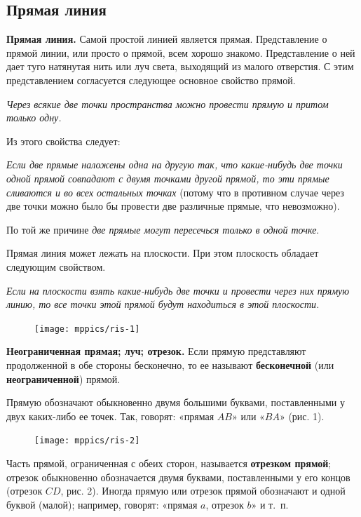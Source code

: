 \documentclass[oneside]{book}
\begin{document}
\subsection*{Прямая линия}

\textbf{Прямая линия.}
Самой простой линией является прямая.
Представление о прямой линии, или просто о прямой, всем хорошо знакомо.
Представление о ней дает туго натянутая нить или луч света, выходящий из малого отверстия.
С этим представлением согласуется следующее основное свойство прямой.

\textit{Через всякие две точки пространства можно провести прямую и притом только одну.}

Из этого свойства следует:

\textit{Если две прямые наложены одна на другую так, что какие-нибудь две точки одной прямой совпадают с двумя точками другой прямой, то эти прямые сливаются и во всех остальных точках} (потому что в противном случае через две точки можно было бы провести две различные прямые, что невозможно).

По той же причине \textit{две прямые могут пересечься только в одной точке}.

Прямая линия может лежать на плоскости.
При этом плоскость обладает следующим свойством.

\textit{Если на плоскости взять какие-нибудь две точки и провести через них прямую линию, то все точки этой прямой будут находиться в этой плоскости.}

\begin{figure}
\texttt{[image: mppics/ris-1]}
\caption{}
\end{figure}

\textbf{Неограниченная прямая; луч; отрезок.}
Если прямую представляют продолженной в обе стороны бесконечно, то ее называют \textbf{бесконечной} (или \textbf{неограниченной}) прямой.

Прямую обозначают обыкновенно двумя большими буквами, поставленными у двух каких-либо ее точек.
Так, говорят:
«прямая $AB$» или «$BA$» (рис. 1).

\begin{figure}
\texttt{[image: mppics/ris-2]}
\caption{}
\end{figure}

Часть прямой, ограниченная с обеих сторон, называется \textbf{отрезком прямой};
отрезок обыкновенно обозначается двумя буквами, поставленными у его концов (отрезок $CD$, рис. 2).
Иногда прямую или отрезок прямой 
обозначают и одной буквой
(малой);
например, говорят:
«прямая $a$, отрезок $b$» и т.~п.
\end{document}
